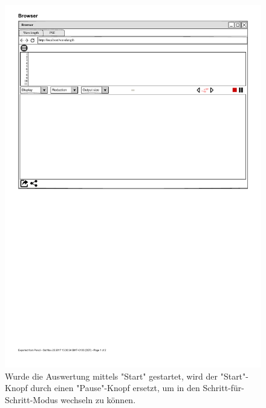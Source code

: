 \documentclass[parskip=full,11pt,twoside]{scrartcl}
\begin{document}
\begin{figure}[H]
	\centering
	\includegraphics{img/pauseButton}
	\caption{Wurde die Auswertung mittels "Start" gestartet, wird der "Start"-Knopf durch einen "Pause"-Knopf ersetzt, um in den Schritt-für-Schritt-Modus wechseln zu können.}
\end{figure}
\end{document}
